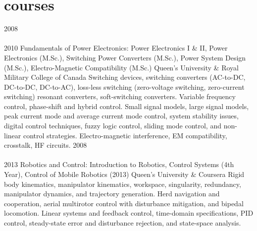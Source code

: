 
\section{courses}
\begin{entrylist}
\entry
  {2008\\\faChevronDown\\2010}
  {Fundamentals of Power Electronics: Power Electronics I \& II, Power Electronics (M.Sc.), Switching Power Converters (M.Sc.), Power System Design (M.Sc.), Electro-Magnetic Compatibility (M.Sc.)}
  {Queen's University \& Royal Military College of Canada}
  {Switching devices, switching converters (AC-to-DC, DC-to-DC, DC-to-AC), 
  loss-less switching (zero-voltage switching, zero-current switching) resonant converters, soft-switching converters. 
  Variable frequency control, phase-shift and hybrid control. Small signal 
  models, large signal models, peak current mode and average current mode control, system stability issues, 
  digital control techniques, fuzzy logic control, sliding mode control, and non-linear control strategies. 
  Electro-magnetic interference, EM compatibility, crosstalk, HF circuits.}
\entry
  {2008\\\faChevronDown\\2013}
  {Robotics and Control: Introduction to Robotics, Control Systems (4th Year), Control of Mobile Robotics (2013)}
  {Queen's University \& Coursera}
  {Rigid body kinematics, manipulator kinematics, workspace, singularity, redundancy, 
  manipulator dynamics, and trajectory generation. Herd navigation and cooperation, aerial multirotor control with disturbance
  mitigation, and bipedal locomotion. Linear systems and feedback control, time-domain specifications, 
  PID control, steady-state error and disturbance rejection, and state-space analysis.}
\end{entrylist}